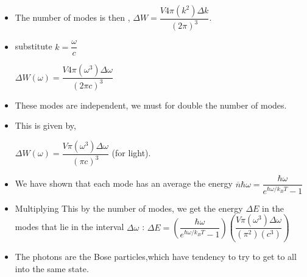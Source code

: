 \documentclass[aspectratio=169]{beamer}
\begin{document}
\begin{frame}
	\begin{itemize}
		\item The number of modes is then , \newline
		\center $\Delta W = \dfrac{V4\pi(k^2)\Delta k}{(2\pi)^3}$.
		\newline
		\item substitute $k = \dfrac{\omega}{c}$\newline
		
		$ \Delta W(\omega) = \dfrac{V4\pi(\omega^3)\Delta \omega}{(2\pi c )^3}$
		
	\end{itemize}
\end{frame}

\begin{frame}
	\begin{itemize}
	\item These modes are independent, we must for double the number of modes.
	\item This is given by,\newline
	
	$ \Delta W(\omega) = \dfrac{V\pi(\omega^3)\Delta \omega}{(\pi c )^3}$  (for light).
	\end{itemize}
\end{frame}

\begin{frame}
	\begin{itemize}
		\item We have shown that each mode has an average the energy \newline 
		$ \overline{n}\hbar\omega = \dfrac{\hbar\omega}{e^{\hbar\omega/k_{B}T} - 1}$\newline
		\item Multiplying This by the number of modes, we get the energy $\Delta E$ in the modes that lie in the interval $\Delta\omega$ : \newline
		\center $ \Delta E = (\dfrac{\hbar\omega}{e^{\hbar\omega/k_{B}T} - 1})(\dfrac{V\pi(\omega^3)\Delta \omega}{(\pi^2)(c^3)})$  \newline
		
	\end{itemize}
\end{frame}

\begin{frame}
	\begin{itemize}
		\item The photons are the Bose particles,which have tendency to try to get to all into the same state.
	\end{itemize}
\end{frame}
\end{document}
